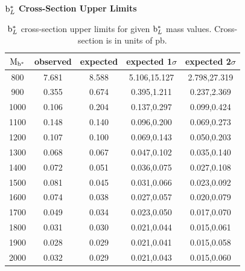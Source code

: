 \begin{table}
\begin{center}
\bf{$\mathrm{b}^{*}_L$ Cross-Section Upper Limits}\\
\begin{tabular}{|c||c|c|c|c|}
\hline
\bf{$\mathrm{M_{\mathrm{b}^{*}}}$} & \bf{observed}  & \bf{expected} & \bf{expected 1$\sigma$}  & \bf{expected 2$\sigma$} \\
\hline
\hline
800 & 7.681 & 8.588 & 5.106,15.127 & 2.798,27.319\\ 
\hline
900 & 0.355 & 0.674 & 0.395,1.211 & 0.237,2.369\\ 
\hline
1000 & 0.106 & 0.204 & 0.137,0.297 & 0.099,0.424\\ 
\hline
1100 & 0.148 & 0.140 & 0.096,0.200 & 0.069,0.273\\ 
\hline
1200 & 0.107 & 0.100 & 0.069,0.143 & 0.050,0.203\\ 
\hline
1300 & 0.068 & 0.067 & 0.047,0.102 & 0.035,0.140\\ 
\hline
1400 & 0.072 & 0.051 & 0.036,0.075 & 0.027,0.108\\ 
\hline
1500 & 0.081 & 0.045 & 0.031,0.066 & 0.023,0.092\\ 
\hline
1600 & 0.074 & 0.038 & 0.027,0.057 & 0.020,0.079\\ 
\hline
1700 & 0.049 & 0.034 & 0.023,0.050 & 0.017,0.070\\ 
\hline
1800 & 0.031 & 0.030 & 0.021,0.044 & 0.015,0.061\\ 
\hline
1900 & 0.028 & 0.029 & 0.021,0.041 & 0.015,0.058\\ 
\hline
2000 & 0.032 & 0.029 & 0.021,0.043 & 0.015,0.060\\ 
\hline
\end{tabular}
\end{center}
\caption{$\mathrm{b}^{*}_L$ cross-section upper limits for given $\mathrm{b}^{*}_L$ mass values.  Cross-section is in units of pb.}
\label{table:bsupperxsecL}
\end{table}


